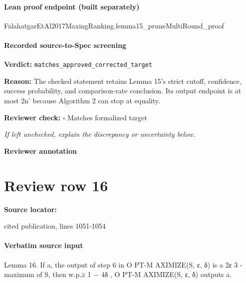 \documentclass[10pt]{article}
\newcommand{\reviewerbox}{%
  \par\noindent\fbox{\parbox{0.96\linewidth}{\rule{0pt}{0.38in}}}\par
}
\newcommand{\reviewmatch}[1]{%
  \par\noindent\textbf{Reviewer check:} $\square$\; #1\par
  \noindent\emph{If left unchecked, explain the discrepancy or uncertainty below.}\par
}
\begin{document}
\paragraph{Lean proof endpoint (built separately)}\begin{ReviewVerbatim}
FalahatgarEtAl2017MaxingRanking.lemma15_pruneMultiRound_proof
\end{ReviewVerbatim}

\paragraph{Recorded source-to-Spec screening}
\textbf{Verdict:} \texttt{matches\_approved\_corrected\_target}
\\
{\raggedright
\textbf{Reason:} The checked statement retains Lemma 15's strict cutoff, confidence, success probability, and comparison-\allowbreak{}rate conclusion.\allowbreak{} Its output endpoint is at most 2n' because Algorithm 2 can stop at equality.\allowbreak{}
\par}
\reviewmatch{Matches formalized target}
\noindent\textbf{Reviewer annotation}\par
\reviewerbox
\clearpage
\hypertarget{source-claim-ad663f8615f67281}{}
\section*{Review row 16}
\textbf{Source locator:} {\footnotesize\raggedright cited publication, lines 1051-\allowbreak{}1054\par}
\paragraph{Verbatim source input}
\begin{ReviewVerbatim}
Lemma 16. If a, the output of step 6 in O PT-M AXIMIZE(S, ε, δ) is a 2ε
                                                                     3
                                                                        -maximum of S, then w.p.≥ 1 − 4δ ,
O PT-M AXIMIZE(S, ε, δ) outputs a.
\end{ReviewVerbatim}
\end{document}

